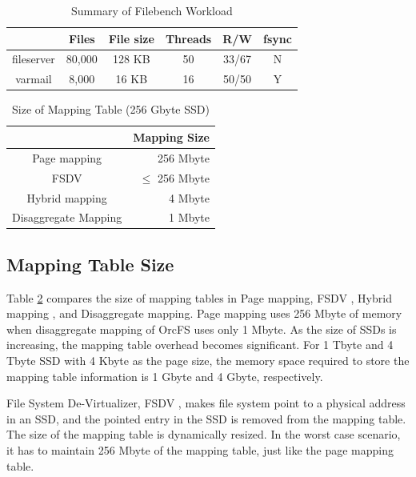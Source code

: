 \documentclass[pageno]{jpaper}
\begin{document}
\begin{table}[t]
\begin{center}
\begin{tabular}{|c|c|c|c|c|c|} \hline
  		     & Files	& File size & Threads & R/W   & fsync 		\\ \hline\hline
  fileserver	& 80,000	& 128 KB	   & 50	    & 33/67 & N\\ \hline
  varmail 	& 8,000	& 16 KB     & 16	    & 50/50 & Y\\ \hline
\end{tabular}
\end{center}
\caption{Summary of Filebench Workload}
\label{tab:filebench}
\end{table}

\begin{table}[t]
\begin{center}
  \begin{tabular}{|c|r|} \hline 
                         & Mapping Size       \\ \hline\hline 
Page mapping             & 256 Mbyte          \\ \hline 
FSDV \cite{zhangremoving} & $\leq$ 256 Mbyte  	\\ \hline 
Hybrid mapping \cite{last08} & 4 Mbyte \\ \hline 
Disaggregate Mapping     & 1 Mbyte            \\ \hline
\end{tabular}
\end{center}
\caption{Size of Mapping Table (256 Gbyte SSD)}
\label{tab:meta_size}
\end{table}

\subsection{Mapping Table Size}

Table \ref{tab:meta_size} compares the size of mapping tables in Page
mapping, FSDV \cite{zhangremoving}, Hybrid mapping \cite{last08}, and
Disaggregate mapping.  Page mapping uses 256 Mbyte of memory when
disaggregate mapping of OrcFS uses only 1 Mbyte. As the size of SSDs
is increasing, the mapping table overhead becomes significant.  For 1
Tbyte and 4 Tbyte SSD with 4 Kbyte as the page size, the memory space
required to store the mapping table information is 1 Gbyte and 4
Gbyte, respectively.

File System De-Virtualizer, FSDV \cite{zhangremoving}, makes file
system point to a physical address in an SSD, and the pointed entry in
the SSD is removed from the mapping table. The size of the mapping
table is dynamically resized. In the worst case scenario, it has to
maintain 256 Mbyte of the mapping table, just like the page mapping
table.
\end{document}
